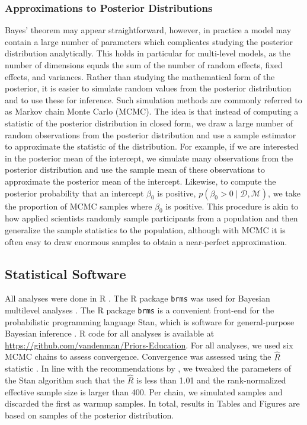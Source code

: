 \documentclass[man, mask]{apa7}
\newcommand{\getValInt}[3]{%
	\pgfplotstablegetelem{#1}{#2}\of{#3}%
	\pgfmathprintnumber[fixed, fixed zerofill=false]{\pgfplotsretval}%
}
\newcommand{\code}[1]{\texttt{#1}}
\newcommand{\prob}[1]{p\left(#1\right)}
\newcommand{\data}{\mathcal{D}}
\newcommand{\model}{\mathcal{M}}
\newcommand{\githubLink}{\url{https://github.com/vandenman/Priors-Education}}
\begin{document}
\subsubsection*{Approximations to Posterior Distributions}
Bayes' theorem may appear straightforward, however, in practice a model may contain a large number of parameters which complicates studying the posterior distribution analytically. 
This holds in particular for multi-level models, as the number of dimensions equals the sum of the number of random effects, fixed effects, and variances.
Rather than studying the mathematical form of the posterior, it is easier to simulate random values from the posterior distribution and to use these for inference.
Such simulation methods are commonly referred to as Markov chain Monte Carlo (MCMC).
The idea is that instead of computing a statistic of the posterior distribution in closed form, we draw a large number of random observations from the posterior distribution and use a sample estimator to approximate the statistic of the distribution.
For example, if we are interested in the posterior mean of the intercept, we simulate many observations from the posterior distribution and use the sample mean of these observations to approximate the posterior mean of the intercept.
Likewise, to compute the posterior probability that an intercept $\beta_0$ is positive, $\prob{\beta_0 > 0 \mid \data , \model}$, we take the proportion of MCMC samples where $\beta_0$ is positive.
This procedure is akin to how applied scientists randomly sample participants from a population and then generalize the sample statistics to the population, although with MCMC it is often easy to draw enormous samples to obtain a near-perfect approximation.

\subsection*{Statistical Software}
\tbMCMCsettings

All analyses were done in R \parencite{R}.
The R package \code{brms} was used for Bayesian multilevel analyses \parencite{burkner2017brms}.
The R package \code{brms} is a convenient front-end for the probabilistic programming language Stan, which is software for general-purpose Bayesian inference \parencite{carpenter2017stan}.
R code for all analyses is available at \githubLink{}.
For all analyses, we used six MCMC chains to assess convergence.
Convergence was assessed using the $\widehat{R}$ statistic \parencite{vehtari2019rank}.
In line with the recommendations by \textcite{vehtari2019rank}, we tweaked the parameters of the Stan algorithm such that the $\widehat{R}$ is less than 1.01 and the rank-normalized effective sample size is larger than 400.
Per chain, we simulated \getValInt{0}{iter}{\tbMCMCsettings} samples and discarded the first \getValInt{0}{warmup}{\tbMCMCsettings} as warmup samples.
In total, results in Tables and Figures are based on \getValInt{0}{total}{\tbMCMCsettings} samples of the posterior distribution.
\end{document}
